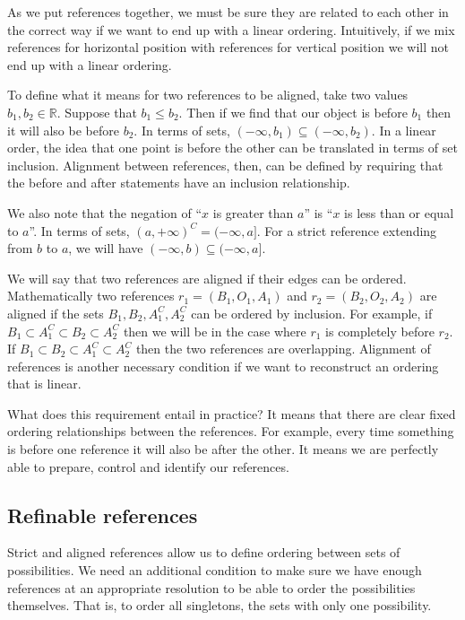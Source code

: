 \documentclass[12pt]{iopart}
\begin{document}
As we put references together, we must be sure they are related to each other in the correct way if we want to end up with a linear ordering. Intuitively, if we mix references for horizontal position with references for vertical position we will not end up with a linear ordering.

To define what it means for two references to be aligned, take two values $b_1, b_2 \in \mathbb{R}$. Suppose that $b_1 \leq b_2$. Then if we find that our object is before $b_1$ then it will also be before $b_2$. In terms of sets, $(-\infty, b_1) \subseteq (-\infty, b_2)$. In a linear order, the idea that one point is before the other can be translated in terms of set inclusion. Alignment between references, then, can be defined by requiring that the before and after statements have an inclusion relationship.

We also note that the negation of ``$x$ is greater than $a$'' is ``$x$ is less than or equal to $a$''. In terms of sets, $(a, +\infty)^C = (-\infty, a]$. For a strict reference extending from $b$ to $a$, we will have $(-\infty, b) \subseteq (-\infty, a]$.

We will say that two references are aligned if their edges can be ordered. Mathematically two references $r_1 = (B_1, O_1, A_1)$ and $r_2 = (B_2, O_2, A_2)$ are aligned if the sets $B_1, B_2, A_1^C, A_2^C$ can be ordered by inclusion. For example, if $B_1 \subset A_1^C \subset B_2 \subset A_2^C$ then we will be in the case where $r_1$ is completely before $r_2$. If $B_1 \subset B_2 \subset A_1^C \subset A_2^C$ then the two references are overlapping. Alignment of references is another necessary condition if we want to reconstruct an ordering that is linear.

What does this requirement entail in practice? It means that there are clear fixed ordering relationships between the references. For example, every time something is before one reference it will also be after the other. It means we are perfectly able to prepare, control and identify our references.

\subsection{Refinable references}

Strict and aligned references allow us to define ordering between sets of possibilities. We need an additional condition to make sure we have enough references at an appropriate resolution to be able to order the possibilities themselves. That is, to order all singletons, the sets with only one possibility.
\end{document}
